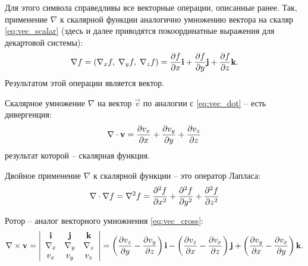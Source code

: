 Для этого символа справедливы все векторные операции, описанные ранее.
Так, применение $\nabla$ к скалярной функции аналогично умножению вектора
на скаляр \cref{eq:vec_scalar} (здесь и далее приводятся покоординатные выражения для декартовой системы):
\begin{equation}
\label{eq:del_grad}
\nabla f  = \left(\nabla_x f, \; \nabla_y f, \; \nabla_z f\right) = \frac{\partial f}{\partial x}\boldsymbol{\rm i} + \frac{\partial f}{\partial y}\boldsymbol{\rm j} + \frac{\partial f}{\partial z}\boldsymbol{\rm k}.
\end{equation}
Результатом этой операции является вектор.

Скалярное умножение $\nabla$ на вектор $\vec v$ по аналогии с \cref{eq:vec_dot} -- есть дивергенция:
\begin{equation}
\label{eq:del_div}
\nabla \cdot \boldsymbol{\rm v}  = \frac{\partial v_x}{\partial x} + \frac{\partial v_y}{\partial y} + \frac{\partial v_z}{\partial z}
\end{equation}
результат которой -- скалярная функция.

Двойное применение $\nabla$ к скалярной функции -- это оператор Лапласа:
\begin{equation}
\label{eq:del_laplace}
\nabla \cdot \nabla f  = \nabla^2 f = \frac{\partial^2 f}{\partial x^2} + \frac{\partial^2 f}{\partial y^2} + \frac{\partial^2 f}{\partial z^2}
\end{equation}

Ротор -- аналог векторного умножнения \cref{eq:vec_cross}:
\begin{equation}
\label{eq:del_rotor}
\nabla\times\boldsymbol{\rm v} = 
\left|
\begin{array}{ccc}
\boldsymbol{\rm i} & \boldsymbol{\rm j} & \boldsymbol{\rm k} \\
\nabla_x & \nabla_y & \nabla_z \\
v_x & v_y & v_z
\end{array}
\right| = 
\left(\frac{\partial v_z}{\partial y} - \frac{\partial v_y}{\partial z}\right)\boldsymbol{\rm i} -
\left(\frac{\partial v_z}{\partial x} - \frac{\partial v_x}{\partial z}\right)\boldsymbol{\rm j} +
\left(\frac{\partial v_y}{\partial x} - \frac{\partial v_x}{\partial y}\right)\boldsymbol{\rm k}.
\end{equation}

